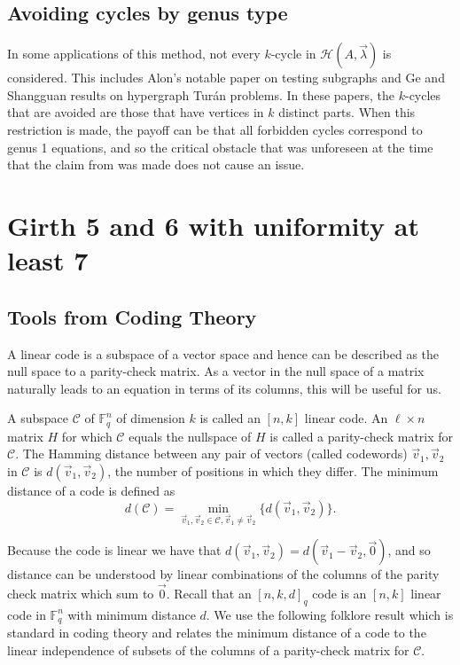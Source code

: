 \documentclass[12pt]{article}%
\begin{document}
\subsection{Avoiding cycles by genus type}\label{sec:avoiding cycles by genus type}

In some applications of this method, not every $k$-cycle in $\mathcal{H}( A , \vec{ \lambda} )$ is considered.  This includes Alon's notable paper on testing subgraphs \cite{alon} and Ge and Shangguan \cite{Ge} results on hypergraph Tur\'{a}n problems.  In these papers, the $k$-cycles that are avoided are those that have vertices in $k$ distinct parts.  When this restriction is made, 
the payoff can be that all forbidden cycles correspond to genus 1 equations, and so the critical obstacle that was unforeseen at the time that the claim from \cite{TV} was made does not cause an issue.



\section{Girth 5 and 6 with uniformity at least 7}\label{sec: codes}



\subsection{Tools from Coding Theory}

\label{subsec:tools-coding-theory} 

A linear code is a subspace of a vector space and hence can be described as the null space to a parity-check matrix. As a vector in the null space of a matrix naturally leads to an equation in terms of its columns, this will be useful for us. 

A subspace $\mathcal{C}$ of $\mathbb{F}_q^n$ of dimension $k$ is called an $[n, k]$ linear code. An $\ell\times n$ matrix $H$ for which $\mathcal{C}$ equals the nullspace of $H$ is called a parity-check matrix for $\mathcal{C}$.  The Hamming distance between any pair of vectors (called codewords) $\vec{v}_1, \vec{v}_2$ in $\mathcal{C}$  is $d(\vec{v}_1, \vec{v}_2)$, the number of positions in which they differ. The minimum distance of a code is defined as
\[ d(\mathcal{C})=\min_{\vec{v}_1,\vec{v}_2\in \mathcal{C}, \vec{v}_1\neq \vec{v}_2}\{d(\vec{v}_1, \vec{v}_2)\}.\]



Because the code is linear we have that $d(\vec{v}_1, \vec{v}_2) = d(\vec{v}_1- \vec{v}_2, \vec{0})$, and so distance can be understood by linear combinations of the columns of the parity check matrix which sum to $\vec{0}$. Recall that an $[n,k,d]_q$ code is an $[n,k]$ linear code in $\mathbb{F}_q^n$ with minimum distance $d$. We use the following folklore result which is standard in coding theory and relates the minimum distance of a code to the linear independence of subsets of the columns of a parity-check matrix for $\mathcal{C}$. 
\end{document}
